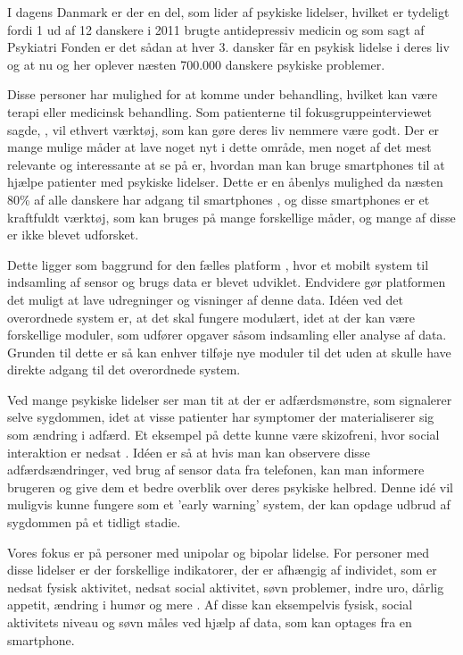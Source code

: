 I dagens Danmark er der en del, som lider af psykiske lidelser, hvilket er tydeligt fordi 1 ud af 12 danskere i 2011 brugte antidepressiv medicin \citep{misc:forbrugAntidepressiva} og som sagt af Psykiatri Fonden er det sådan at hver 3. dansker får en psykisk lidelse i deres liv og at nu og her oplever næsten 700.000 danskere psykiske problemer\citep{psykiatrifonden}. 

Disse personer har mulighed for at komme under behandling, hvilket kan være terapi eller medicinsk behandling.
Som patienterne til fokusgruppeinterviewet sagde, \citep[Kapitel 1, Sektion 5]{misc:faellesrapp}, vil ethvert værktøj, som kan gøre deres liv nemmere være godt.
Der er mange mulige måder at lave noget nyt i dette område, men noget af det mest relevante og interessante at se på er, hvordan man kan bruge smartphones til at hjælpe patienter med psykiske lidelser.
Dette er en åbenlys mulighed da næsten 80\% af alle danskere har adgang til smartphones \citep{misc:dstElektronik}, og disse smartphones er et kraftfuldt værktøj, som kan bruges på mange forskellige måder, og mange af disse er ikke blevet udforsket.

Dette ligger som baggrund for den fælles platform \citep{misc:faellesrapp}, hvor et mobilt system til indsamling af sensor og brugs data er blevet udviklet. 
Endvidere gør platformen det muligt at lave udregninger og visninger af denne data.
Idéen ved det overordnede system er, at det skal fungere modulært, idet at der kan være forskellige moduler, som udfører opgaver såsom indsamling eller analyse af data. 
Grunden til dette er så kan enhver tilføje nye moduler til det uden at skulle have direkte adgang til det overordnede system.

Ved mange psykiske lidelser ser man tit at der er adfærdsmønstre, som signalerer selve sygdommen, idet at visse patienter har symptomer der materialiserer sig som ændring i adfærd.
Et eksempel på dette kunne være skizofreni, hvor social interaktion er nedsat \citep{misc:negativeSymptomsSchizo}.
Idéen er så at hvis man kan observere disse adfærdsændringer, ved brug af sensor data fra telefonen, kan man informere brugeren og give dem et bedre overblik over deres psykiske helbred.
Denne idé vil muligvis kunne fungere som et 'early warning' system, der kan opdage udbrud af sygdommen på et tidligt stadie.

Vores fokus er på personer med unipolar og bipolar lidelse. 
For personer med disse lidelser er der forskellige indikatorer, der er afhængig af individet, som er nedsat fysisk aktivitet, nedsat social aktivitet, søvn problemer, indre uro, dårlig appetit, ændring i humør og mere \citep{misc:faellesrapp}.
Af disse kan eksempelvis fysisk, social aktivitets niveau og søvn måles ved hjælp af data, som kan optages fra en smartphone.

